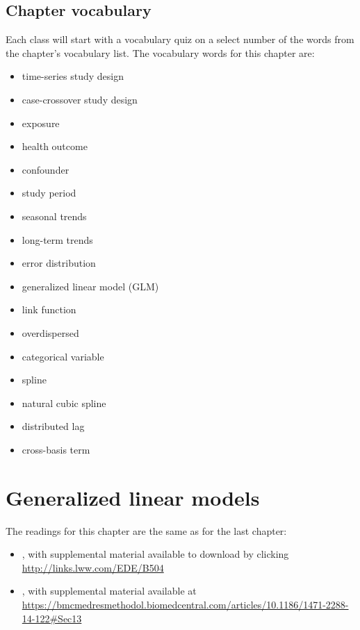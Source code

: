 \documentclass[
]{book}
\providecommand{\tightlist}{%
  \setlength{\itemsep}{0pt}\setlength{\parskip}{0pt}}
\begin{document}
\hypertarget{chapter-vocabulary}{%
\section{Chapter vocabulary}\label{chapter-vocabulary}}

Each class will start with a vocabulary quiz on a select number of the words
from the chapter's vocabulary list. The vocabulary words for this chapter are:

\begin{itemize}
\tightlist
\item
  time-series study design
\item
  case-crossover study design
\item
  exposure
\item
  health outcome
\item
  confounder
\item
  study period
\item
  seasonal trends
\item
  long-term trends
\item
  error distribution
\item
  generalized linear model (GLM)
\item
  link function
\item
  overdispersed
\item
  categorical variable
\item
  spline
\item
  natural cubic spline
\item
  distributed lag
\item
  cross-basis term
\end{itemize}

\hypertarget{generalized-linear-models}{%
\chapter{Generalized linear models}\label{generalized-linear-models}}

The readings for this chapter are the same as for the last chapter:

\begin{itemize}
\tightlist
\item
  \citet{vicedo2019hands}, with supplemental material available to download by
  clicking \url{http://links.lww.com/EDE/B504}
\item
  \citet{armstrong2014conditional}, with supplemental material available at
  \url{https://bmcmedresmethodol.biomedcentral.com/articles/10.1186/1471-2288-14-122\#Sec13}
\end{itemize}
\end{document}

